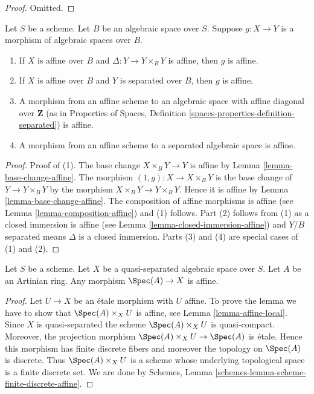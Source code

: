 \begin{proof}
Omitted.
\end{proof}

\begin{lemma}
\label{lemma-affine-permanence}
Let $S$ be a scheme. Let $B$ be an algebraic space over $S$.
Suppose $g : X \to Y$ is a morphism of algebraic spaces over $B$.
\begin{enumerate}
\item If $X$ is affine over $B$ and $\Delta : Y \to Y \times_B Y$ is affine,
then $g$ is affine.
\item If $X$ is affine over $B$ and $Y$ is separated over $B$,
then $g$ is affine.
\item A morphism from an affine scheme to an algebraic space with affine
diagonal over $\mathbf{Z}$ (as in Properties of Spaces, Definition
\ref{spaces-properties-definition-separated}) is affine.
\item A morphism from an affine scheme to a separated algebraic space
is affine.
\end{enumerate}
\end{lemma}

\begin{proof}
Proof of (1). The base change $X \times_B Y \to Y$ is affine by
Lemma \ref{lemma-base-change-affine}.
The morphism $(1, g) : X \to X \times_B Y$ is the base change of
$Y \to Y \times_B Y$ by the morphism $X \times_B Y \to Y \times_B Y$.
Hence it is affine by
Lemma \ref{lemma-base-change-affine}.
The composition of affine morphisms is affine
(see Lemma \ref{lemma-composition-affine}) and (1) follows.
Part (2) follows from (1) as a closed immersion is affine
(see Lemma \ref{lemma-closed-immersion-affine}) and $Y/B$ separated
means $\Delta$ is a closed immersion. Parts (3) and (4) are special
cases of (1) and (2).
\end{proof}

\begin{lemma}
\label{lemma-Artinian-affine}
Let $S$ be a scheme. Let $X$ be a quasi-separated algebraic space over $S$.
Let $A$ be an Artinian ring. Any morphism $\Spec(A) \to X$ is affine.
\end{lemma}

\begin{proof}
Let $U \to X$ be an \'etale morphism with $U$ affine. To prove the
lemma we have to show that $\Spec(A) \times_X U$ is affine, see
Lemma \ref{lemma-affine-local}. Since $X$ is quasi-separated the
scheme $\Spec(A) \times_X U$ is quasi-compact. Moreover, the
projection morphism $\Spec(A) \times_X U \to \Spec(A)$ is \'etale.
Hence this morphism has finite discrete fibers and moreover
the topology on $\Spec(A)$ is discrete. Thus $\Spec(A) \times_X U$
is a scheme whose underlying topological
space is a finite discrete set. We are done by
Schemes, Lemma \ref{schemes-lemma-scheme-finite-discrete-affine}.
\end{proof}












